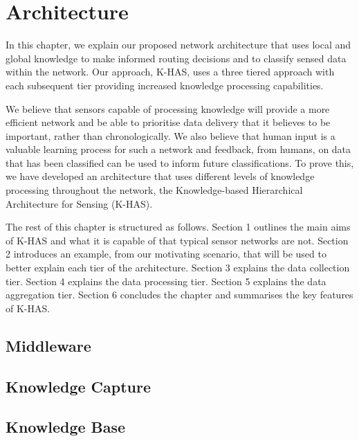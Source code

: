 \chapter{Architecture}\label{chap:arch}
	In this chapter, we explain our proposed network architecture that uses local and global knowledge to make informed routing decisions and to classify sensed data within the network. Our approach, K-HAS, uses a three tiered approach with each subsequent tier providing increased knowledge processing capabilities. 

	We believe that sensors capable of processing knowledge will provide a more efficient network and be able to prioritise data delivery that it believes to be important, rather than chronologically. We also believe that human input is a valuable learning process for such a network and feedback, from humans, on data that has been classified can be used to inform future classifications. To prove this, we have developed an architecture that uses different levels of knowledge processing throughout the network, the Knowledge-based Hierarchical Architecture for Sensing (K-HAS).

	The rest of this chapter is structured as follows. Section 1 outlines the main aims of K-HAS and what it is capable of that typical sensor networks are not. Section 2 introduces an example, from our motivating scenario, that will be used to better explain each tier of the architecture. Section 3 explains the data collection tier. Section 4 explains the data processing tier. Section 5 explains the data aggregation tier. Section 6 concludes the chapter and summarises the key features of K-HAS.
	
	\section{Middleware}
	
	\section{Knowledge Capture}	
	
	\section{Knowledge Base}

